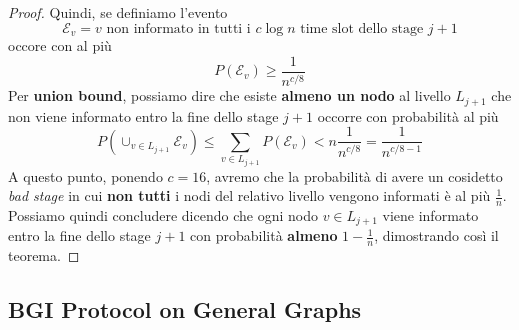 \begin{teorema}
\begin{proof}
        Quindi, se definiamo l'evento
        \[
            \mathcal{E}_v = v \text{ non informato in tutti i } c\log n  \text{ time slot dello stage } j+1
        \]
        occore con al più
        \[
            P(\mathcal{E}_v) \geq \frac{1}{n^{c/8}}
        \]
        Per \textbf{union bound}, possiamo dire che esiste \textbf{almeno un nodo} al livello $L_{j+1}$ che non viene informato entro la fine dello stage $j+1$ occorre con probabilità al più
        \[
            P\left(\cup_{v \in L_{j+1}} \mathcal{E}_v \right) \leq \sum_{v \in L_{j+1}}  P(\mathcal{E}_v) < n \frac{1}{n^{c/8}} = \frac{1}{n^{c/8 - 1}}
        \]
        A questo punto, ponendo $c = 16$, avremo che la probabilità di avere un cosidetto \textit{bad stage} in cui \textbf{non tutti} i nodi del relativo livello vengono informati è al più $\frac{1}{n}$. Possiamo quindi concludere dicendo che ogni nodo $v \in L_{j+1}$ viene informato entro la fine dello stage $j+1$ con probabilità \textbf{almeno} $1 - \frac{1}{n}$, dimostrando così il teorema.
    \end{proof}
\end{teorema}

\subsection{BGI Protocol on General Graphs}
